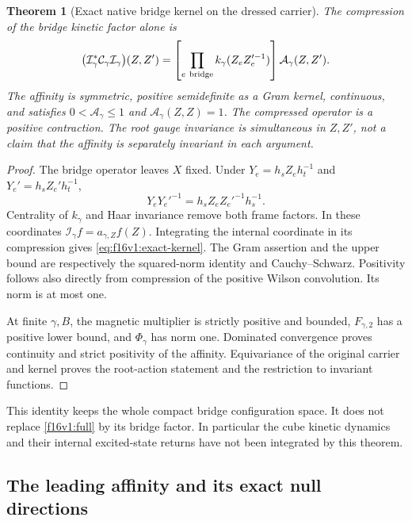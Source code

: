 \documentclass[11pt,oneside]{article}
\newtheorem{theorem}{Theorem}[section]
\begin{document}
\begin{theorem}[Exact native bridge kernel on the dressed carrier]
\label{f16v1:exact-kernel}
The compression of the bridge kinetic factor alone is
\begin{equation}
 \bigl(\mathcal I_\gamma^*\mathcal C_\gamma
                      \mathcal I_\gamma\bigr)(Z,Z')
   =\left[\prod_{e\ {\rm bridge}}
             k_\gamma(Z_eZ_e'^{-1})\right]\mathcal A_\gamma(Z,Z').
 \label{eq:f16v1:exact-kernel}
\end{equation}
The affinity is symmetric, positive semidefinite as a Gram kernel,
continuous, and satisfies \(0<\mathcal A_\gamma\le1\) and
\(\mathcal A_\gamma(Z,Z)=1\).
The compressed operator is a positive contraction.
The root gauge invariance is simultaneous in \(Z,Z'\), not
a claim that the affinity is separately invariant in each argument.
\end{theorem}

\begin{proof}
The bridge operator leaves \(X\) fixed. Under
\(Y_e=h_s Z_eh_t^{-1}\) and \(Y_e'=h_s Z_e'h_t^{-1}\),
\[
                  Y_eY_e'^{-1}
                       =h_s Z_eZ_e'^{-1}h_s^{-1}.
\]
Centrality of \(k_\gamma\) and Haar invariance remove both frame
factors. In these coordinates \(\mathcal I_\gamma f=a_{\gamma,Z}f(Z)\).
Integrating the internal coordinate in its compression gives
\eqref{eq:f16v1:exact-kernel}. The Gram assertion and the upper
bound are respectively the squared-norm identity and Cauchy--Schwarz.
Positivity follows also directly from compression of the positive
Wilson convolution. Its norm is at most one.

At finite \(\gamma,B\), the magnetic multiplier is strictly positive
and bounded, \(F_{\gamma,2}\) has a positive lower bound, and
\(\Phi_\gamma\) has norm one. Dominated convergence proves
continuity and strict positivity of the affinity. Equivariance
of the original carrier and kernel proves the root-action
statement and the restriction to invariant functions.
\end{proof}

This identity keeps the whole compact bridge configuration space.
It does not replace \eqref{f16v1:full} by its bridge factor.
In particular the cube kinetic dynamics and their internal
excited-state returns have not been integrated by this theorem.

\subsection{The leading affinity and its exact null directions}
\end{document}

